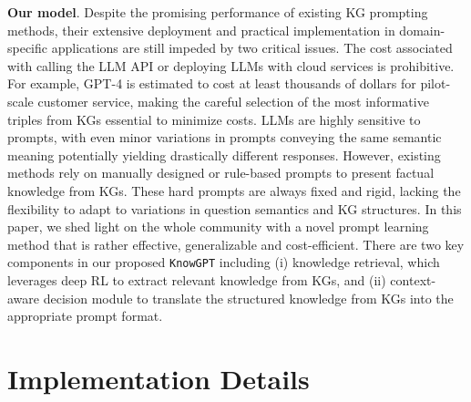 \documentclass{article}
\theoremstyle{boldremark}
\begin{document}
{\bf Our model}.
Despite the promising performance of existing KG prompting methods, their extensive deployment and practical implementation in domain-specific applications are still impeded by two critical issues. \textbf{} The cost associated with calling the LLM API or deploying LLMs with cloud services is prohibitive.  For example, GPT-4 is estimated to cost at least thousands of dollars for pilot-scale customer service, making the careful selection of the most informative triples from KGs essential to minimize costs. \textbf{} LLMs are highly sensitive to prompts, with even minor variations in prompts conveying the same semantic meaning potentially yielding drastically different responses. However, existing methods rely on manually designed or rule-based prompts to present factual knowledge from KGs. These hard prompts are always fixed and rigid, lacking the flexibility to adapt to variations in question semantics and KG structures. %
In this paper, we shed light on the whole community with a novel prompt learning method that is rather effective, generalizable and cost-efficient. There are two key components in our proposed \texttt{KnowGPT} including (i) knowledge retrieval, which leverages deep RL to extract relevant knowledge from KGs, and (ii) context-aware decision module to translate the structured knowledge from KGs into the appropriate prompt format.

\section{Implementation Details}
\end{document}
